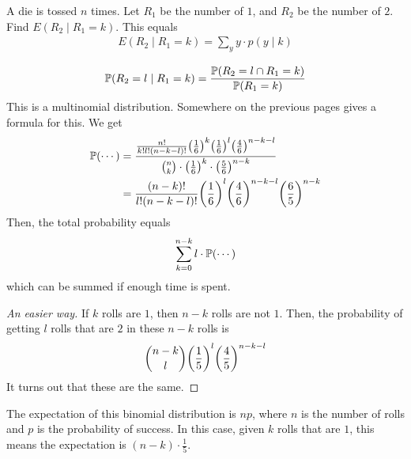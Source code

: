 \begin{example}
    A die is tossed $n$ times. Let $R_1$ be the number of $1$, and $R_2$ be the number of $2$. Find $E(R_2 \mid R_1 = k)$. This equals
    \begin{align}
        E(R_2 \mid R_1 = k) = \sum_y y \cdot p(y \mid k)
    \end{align}
\end{example}
\begin{solution}
    \begin{align}
        \mathbb{P}(R_2 = l \mid R_1 = k) = \frac{\mathbb{P}(R_2 = l \cap R_1 = k)}{\mathbb{P}(R_1 = k)}
    \end{align}
    This is a multinomial distribution. Somewhere on the previous pages gives a formula for this. We get
    \begin{align}
        \mathbb{P}(\cdots) &= \dfrac{\frac{n!}{k!l!(n-k-l)!}\qty(\frac{1}{6})^k \qty(\frac{1}{6})^l \qty(\frac{4}{6})^{n-k-l}}{\binom{n}{k} \cdot \qty(\frac{1}{6})^k \cdot \qty(\frac{5}{6})^{n-k}}\\
        &= \frac{(n-k)!}{l!(n-k-l)!} \qty(\frac{1}{6})^l \qty(\frac{4}{6})^{n-k-l} \qty(\frac{6}{5})^{n-k}
    \end{align}
    Then, the total probability equals
    \begin{align}
        \sum_{k=0}^{n-k} l \cdot \mathbb{P}(\cdots)
    \end{align}
    which can be summed if enough time is spent.
\end{solution}

\begin{proof}[An easier way]
    If $k$ rolls are $1$, then $n-k$ rolls are not $1$. Then, the probability of getting $l$ rolls that are $2$ in these $n-k$ rolls is
    \begin{align}
        \binom{n-k}{l} \qty(\frac{1}{5})^l \qty(\frac{4}{5})^{n-k-l}
    \end{align}
    It turns out that these are the same.
\end{proof}

The expectation of this binomial distribution is $np$, where $n$ is the number of rolls and $p$ is the probability of success. In this case, given $k$ rolls that are $1$, this means the expectation is $(n-k) \cdot \frac{1}{5}$.

